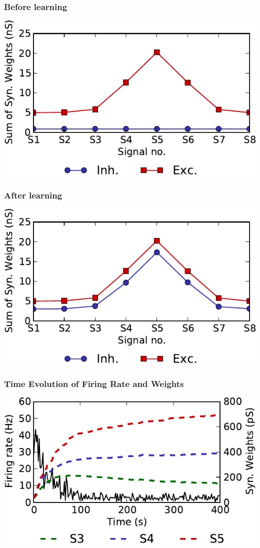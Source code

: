 \documentclass{beamer}
\begin{document}
\begin{frame} \frametitle{Before learning}
    \begin{center}
        \includegraphics[width=\textwidth]{figures/weights_before}
    \end{center}
\end{frame}

\begin{frame} \frametitle{After learning}
    \begin{center}
        \includegraphics[width=\textwidth]{figures/weights_after}
    \end{center}
\end{frame}

\begin{frame} \frametitle{Time Evolution of Firing Rate and Weights}
    \begin{center}
        \includegraphics[width=\textwidth]{figures/evo_orig}
    \end{center}
\end{frame}
\end{document}
